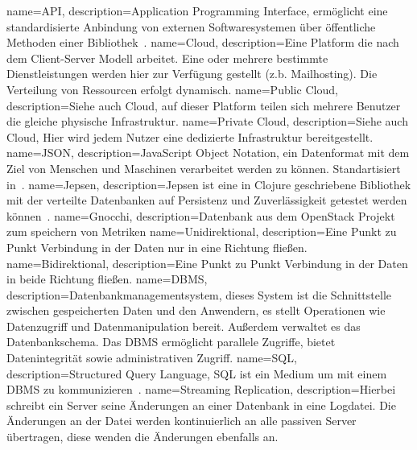 {
  name=API,
  description={Application Programming Interface, ermöglicht eine
               standardisierte Anbindung von externen Softwaresystemen über
               öffentliche Methoden einer Bibliothek~\cite{HowDoAPIsEvolve}.}
}
{
  name=Cloud,
  description={Eine Platform die nach dem Client-Server Modell arbeitet. Eine
               oder mehrere bestimmte Dienstleistungen werden hier zur
               Verfügung gestellt (z.b. Mailhosting). Die Verteilung von
               Ressourcen erfolgt dynamisch.}
}
{
  name=Public Cloud,
  description={Siehe auch \gls{Cloud}, auf dieser Platform teilen sich mehrere
               Benutzer die gleiche physische Infrastruktur.}
}
{
  name=Private Cloud,
  description={Siehe auch \gls{Cloud}, Hier wird jedem Nutzer eine dedizierte
               Infrastruktur bereitgestellt.}
}
{
  name=JSON,
  description={JavaScript Object Notation, ein Datenformat mit dem Ziel von
               Menschen und Maschinen verarbeitet werden zu können.
               Standartisiert in~\cite{RFC7159}.}
}
{
  name=Jepsen,
  description={Jepsen ist eine in Clojure geschriebene Bibliothek mit der
               verteilte Datenbanken auf Persistenz und Zuverlässigkeit
               getestet werden können~\cite{Jepsen_Introduction}.}
}
{
  name=Gnocchi,
  description={Datenbank aus dem OpenStack Projekt zum speichern von Metriken}
}
{
  name=Unidirektional,
  description={Eine Punkt zu Punkt Verbindung in der Daten nur in eine Richtung
               fließen.}
}
{
  name=Bidirektional,
  description={Eine Punkt zu Punkt Verbindung in der Daten in beide Richtung
               fließen.}
}
{
  name=DBMS,
  description={Datenbankmanagementsystem, dieses System ist die Schnittstelle
               zwischen gespeicherten Daten und den Anwendern, es stellt
               Operationen wie Datenzugriff und Datenmanipulation bereit.
               Außerdem verwaltet es das Datenbankschema. Das DBMS ermöglicht
               parallele Zugriffe, bietet Datenintegrität sowie administrativen
               Zugriff.}
}
{
  name=SQL,
  description={Structured Query Language, SQL ist ein Medium um mit einem
               \gls{DBMS} zu kommunizieren~\cite{sumathi2007fundamentals}.}
}
{
  name=Streaming Replication,
  description={Hierbei schreibt ein Server seine Änderungen an einer Datenbank
               in eine Logdatei. Die Änderungen an der Datei werden
               kontinuierlich an alle passiven Server übertragen, diese wenden
               die Änderungen ebenfalls an.}
}
